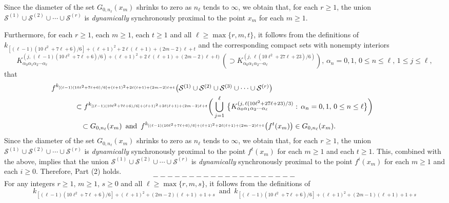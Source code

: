 \documentclass[12pt]{article}
\newcommand{\al}{\alpha}
\begin{document}
\indent Since the diameter of the set $G_{0,n_\ell}(x_m)$ shrinks to zero as $n_\ell$ tends to $\infty$, we obtain that, for each $r \ge 1$, the union $\mathcal S^{(1)} \cup \mathcal S^{(2)} \cup \cdots \cup \mathcal S^{(r)}$ is {\it dynamically} synchronously proximal to the point $x_m$ for each $m \ge 1$.  

Furthermore, for each $r \ge 1$, each $m \ge 1$, each $t \ge 1$ and all $\ell \ge \max \{ r, m, t \}$, it follows from the definitions of $k_{[(\ell-1)(10\ell^2+7\ell+6)/6]+(\ell+1)^2+2\ell(\ell+1)+(2m-2)\ell+t}$ and the corresponding compact sets with nonempty interiors 
$$
K_{\al_0\al_1\al_2\cdots\al_\ell}^{(j, \, (\ell-1)(10\ell^2+7\ell+6)/6)+(\ell+1)^2+2\ell(\ell+1)+(2m-2)\ell+t)} \, (\supset K_{\al_0\al_1\al_2\cdots\al_\ell}^{(j, \, \ell(10\ell^2+27\ell+23)/6)}), \, \al_n = 0, 1, \, 0 \le n \le \ell, \, 1 \le j \le \ell, 
$$
that
\begin{multline*}
$$
\,\,\, f^{k_{[(\ell-1)(10\ell^2+7\ell+6)/6]+(\ell+1)^2+2\ell(\ell+1)+(2m-2)\ell+t}}\big(\mathcal S^{(1)} \cup \mathcal S^{(2)} \cup \mathcal S^{(3)} \cup \cdots \cup \mathcal S^{(r)}\big) \qquad\qquad\qquad\qquad\qquad\qquad\qquad\quad\quad\quad\quad\\
\subset f^{k_{[(\ell-1)(10\ell^2+7\ell+6)/6]+(\ell+1)^2+2\ell(\ell+1)+(2m-2)\ell+t}}\bigg(\bigcup_{j=1}^\ell \, \big\{ K_{\al_0\al_1\al_2\cdots\al_\ell}^{(j, \, \ell(10\ell^2+27\ell+23)/3)}: \, \al_n = 0, 1, \, 0 \le n \le \ell \big\}\bigg) \\ 
\qquad\,\,\,\, \subset G_{0,n_\ell}(x_m) \,\,\, \text{and} \,\,\, f^{k_{[(\ell-1)(10\ell^2+7\ell+6)/6]+(\ell+1)^2+2\ell(\ell+1)+(2m-2)\ell+t}}\big(f^t(x_m)\big) \in G_{0,n_\ell}(x_m). \qquad\qquad\qquad\quad
$$
\end{multline*}
\indent Since the diameter of the set $G_{0,n_\ell}(x_m)$ shrinks to zero as $n_\ell$ tends to $\infty$, we obtain that, for each $r \ge 1$, the union $\mathcal S^{(1)} \cup \mathcal S^{(2)} \cup \cdots \cup \mathcal S^{(r)}$ is {\it dynamically} synchronously proximal to the point $f^t(x_m)$ for each $m \ge 1$ and each $t \ge 1$.  This, combined with the above, implies that the union $\mathcal S^{(1)} \cup \mathcal S^{(2)} \cup \cdots \cup \mathcal S^{(r)}$ is {\it dynamically} synchronously proximal to the point $f^i(x_m)$ for each $m \ge 1$ and each $i \ge 0$.  Therefore, Part (2) holds.   
$$--------------------$$
\indent For any integers $r \ge 1$, $m \ge 1$, $s \ge 0$ and all $\ell \ge \max \{ r, m, s \}$, it follows from the definitions of 
$$
k_{[(\ell-1)(10\ell^2+7\ell+6)/6]+(\ell+1)^2+(2m-2)(\ell+1)+1+s} \,\,\, \text{and} \,\,\, k_{[(\ell-1)(10\ell^2+7\ell+6)/6]+(\ell+1)^2+(2m-1)(\ell+1)+1+s}
$$ 
\end{document}
